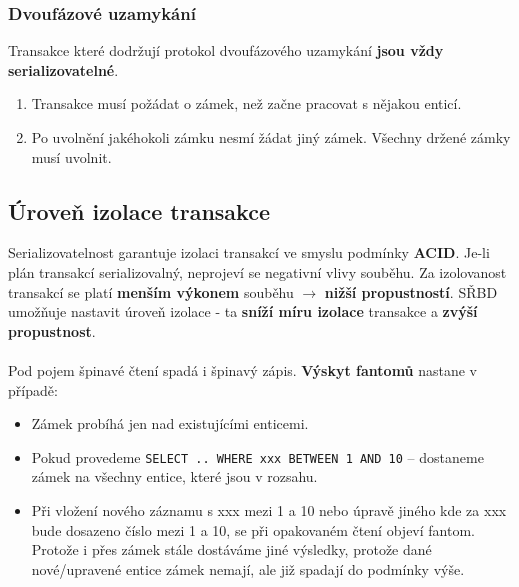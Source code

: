 \subsubsection{Dvoufázové uzamykání}
Transakce které dodržují protokol dvoufázového uzamykání \textbf{jsou vždy serializovatelné}.
\begin{enumerate}
	\item Transakce musí požádat o zámek, než začne pracovat s nějakou enticí.
	\item Po uvolnění jakéhokoli zámku nesmí žádat jiný zámek. Všechny držené zámky musí uvolnit.
\end{enumerate}


\subsection{Úroveň izolace transakce}
Serializovatelnost garantuje izolaci transakcí ve smyslu podmínky \textbf{ACID}. Je-li plán transakcí serializovalný, neprojeví se negativní vlivy souběhu. Za izolovanost transakcí se platí \textbf{menším výkonem} souběhu $\rightarrow$ \textbf{nižší propustností}. SŘBD umožňuje nastavit úroveň izolace - ta \textbf{sníží míru izolace} transakce a \textbf{zvýší propustnost}.
\\\\
\noindent Pod pojem špinavé čtení spadá i špinavý zápis. \textbf{Výskyt fantomů} nastane v případě:
\begin{itemize}
	\item Zámek probíhá jen nad existujícími enticemi.
	\item Pokud provedeme \texttt{SELECT .. WHERE xxx BETWEEN 1 AND 10} -- dostaneme zámek na všechny entice, které jsou v rozsahu.
	\item Při vložení nového záznamu s xxx mezi 1 a 10 nebo úpravě jiného kde za xxx bude dosazeno číslo mezi 1 a 10, se při opakovaném čtení objeví fantom. Protože i přes zámek stále dostáváme jiné výsledky, protože dané nové/upravené entice zámek nemají, ale již spadají do podmínky výše.
\end{itemize}
\noindent{}